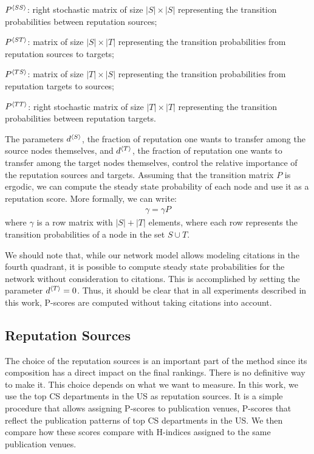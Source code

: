 \documentclass[man,floatsintext]{apa6}
\begin{document}
\begin{description}
\item $P{^{\langle SS \rangle}}$: right stochastic matrix of size $|S|\times |S|$ representing the transition probabilities between reputation sources;
\item $P{^{\langle ST \rangle}}$: matrix of size $|S|\times |T|$ representing the transition probabilities from reputation sources to targets;
\item $P{^{\langle TS \rangle}}$: matrix of size $|T|\times |S|$ representing the transition probabilities from reputation targets to sources;
\item $P{^{\langle TT \rangle}}$: right stochastic matrix of size $|T|\times |T|$ representing the transition probabilities between reputation targets.
\end{description}

The parameters $d{^{\langle S \rangle}}$, the fraction of reputation one wants to transfer among the source nodes themselves, 
and $d{^{\langle T \rangle}}$, the fraction of reputation one wants to transfer among the target nodes themselves,
control the relative importance of the reputation sources and targets. 
Assuming that the transition matrix $P$ is ergodic, we can compute the steady state probability of each node and use it as a reputation score. 
More formally, we can write: 
\begin{align}
\label{eq:ggP}
\gamma = \gamma P
\end{align}
\noindent where $\gamma$ is a row matrix with $|S|+|T|$ elements, 
where each row represents the transition probabilities of a node in the set $S\cup T$. 

We should note that, while our network model allows modeling citations in the fourth quadrant, it is possible to compute 
steady state probabilities for the network without consideration to citations. This is accomplished by setting the parameter 
$d{^{\langle T \rangle}} = 0$. 
Thus, it should be clear that in all experiments described in this work, P-scores 
are computed without taking citations into account. 

\subsection{Reputation Sources}
\label{sec:rep-sources}

The choice of the reputation sources is an important part of the method since its composition has a direct impact on the final rankings. There is no definitive way to make it. This choice depends on what we want to measure. In this work, we 
use the top CS departments in the US as reputation sources. It is a simple procedure that allows assigning P-scores 
to publication venues, P-scores that 
reflect the publication patterns of top CS departments in the US. 
We then compare how these scores compare with H-indices assigned to the same publication venues. 
\end{document}
